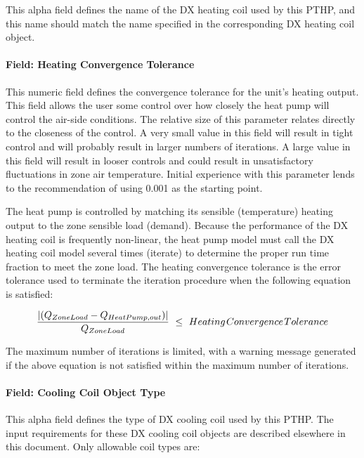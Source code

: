 This alpha field defines the name of the DX heating coil used by this PTHP, and this name should match the name specified in the corresponding DX heating coil object.

\paragraph{Field: Heating Convergence Tolerance}\label{field-heating-convergence-tolerance-3}

This numeric field defines the convergence tolerance for the unit's heating output. This field allows the user some control over how closely the heat pump will control the air-side conditions. The relative size of this parameter relates directly to the closeness of the control. A very small value in this field will result in tight control and will probably result in larger numbers of iterations. A large value in this field will result in looser controls and could result in unsatisfactory fluctuations in zone air temperature. Initial experience with this parameter lends to the recommendation of using 0.001 as the starting point.

The heat pump is controlled by matching its sensible (temperature) heating output to the zone sensible load (demand). Because the performance of the DX heating coil is frequently non-linear, the heat pump model must call the DX heating coil model several times (iterate) to determine the proper run time fraction to meet the zone load. The heating convergence tolerance is the error tolerance used to terminate the iteration procedure when the following equation is satisfied:

\begin{equation}
\frac{{\left| {({Q_{ZoneLoad}} - {Q_{HeatPump,out}})} \right|}}{{{Q_{ZoneLoad}}}}\,\, \le \,\,Heating{\kern 1pt} Convergence{\kern 1pt} Tolerance
\end{equation}

The maximum number of iterations is limited, with a warning message generated if the above equation is not satisfied within the maximum number of iterations.

\paragraph{Field: Cooling Coil Object Type}\label{field-cooling-coil-object-type-4-000}

This alpha field defines the type of DX cooling coil used by this PTHP. The input requirements for these DX cooling coil objects are described elsewhere in this document. Only allowable coil types are:

